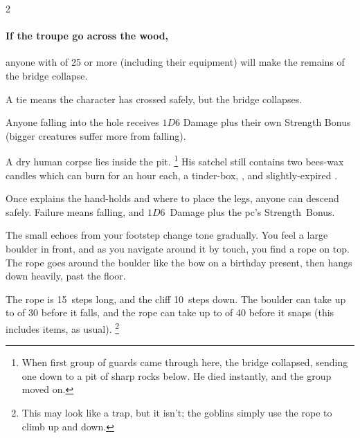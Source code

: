 \begin{multicols}{2}
\paragraph{If the troupe go across the wood,}
anyone with  of 25 or more (including their \gls{equipment}) will make the remains of the bridge collapse.

A tie means the character has crossed safely, but the bridge collapses.

Anyone falling into the hole receives $1D6$ Damage plus their own Strength Bonus (bigger creatures suffer more from falling).

\label{caveCoinsI}
A dry human corpse lies inside the pit.%
\footnote{When first group of \glspl{guard} came through here, the bridge collapsed, sending one down to a pit of sharp rocks below.
He died instantly, and the group moved on.}
His satchel still contains two bees-wax candles which can burn for an hour each, a tinder-box, \lootMedium, and slightly-expired \rations.

\setcounter{diceNo}{0}%
\renewcommand\npcsymbol{\currency}%


Once  explains the hand-holds and where to place the legs, anyone can descend safely.
Failure means falling, and $1D6$~Damage plus the \gls{pc}'s Strength~Bonus.



\begin{boxtext}
  The small echoes from your footstep change tone gradually.
  You feel a large boulder in front, and as you navigate around it by touch, you find a rope on top.
  The rope goes around the boulder like the bow on a birthday present, then hangs down heavily, past the floor.
\end{boxtext}

The rope is 15~\glspl{step} long, and the cliff 10~\glspl{step} down.%
The boulder can take up to  of 30 before it falls, and the rope can take up to  of 40 before it snaps (this includes items, as usual).%
\footnote{This may look like a trap, but it isn't; the goblins simply use the rope to climb up and down.}


\end{multicols}
